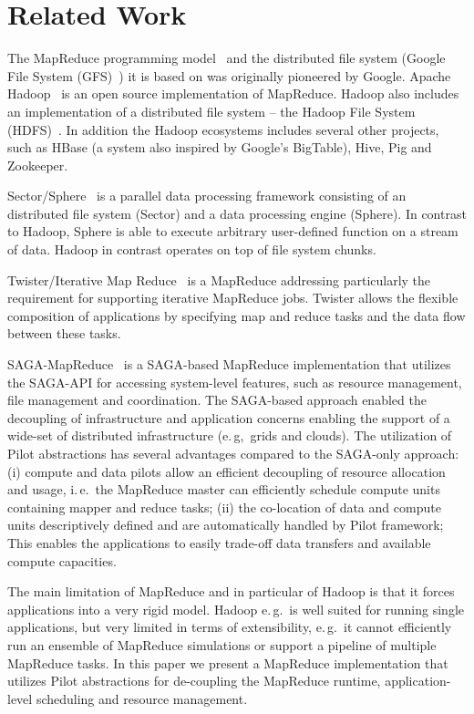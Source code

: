 \documentclass{acm_proc_article-sp}
\newcommand{\pilot}{Pilot\xspace}
\begin{document}
\section{Related Work}

The MapReduce programming model~\cite{Dean:2004:MSD:1251254.1251264} and the
distributed file system (Google File System
(GFS)~\cite{Ghemawat:2003:GFS:1165389.945450}) it is based on was originally
pioneered by Google. Apache Hadoop~\cite{hadoop} is an open source
implementation of MapReduce. Hadoop also includes an implementation of a
distributed file system -- the Hadoop File System
(HDFS)~\cite{Borthakur:2007fk}. In addition the Hadoop ecosystems includes
several other projects, such as HBase (a system also inspired by Google's
BigTable), Hive, Pig and Zookeeper.

Sector/Sphere~\cite{Gu_Grossman_2009} is a parallel data processing framework
consisting of an distributed file system (Sector) and a data processing engine
(Sphere). In contrast to Hadoop, Sphere is able to execute arbitrary 
user-defined function on a stream of data. Hadoop in contrast operates on top 
of file system chunks.

Twister/Iterative Map Reduce~\cite{Ekanayake:2010:TRI:1851476.1851593} is a 
MapReduce addressing particularly the requirement for supporting iterative 
MapReduce jobs. Twister allows the flexible composition of applications by 
specifying map and reduce tasks and the data flow between these tasks. 


SAGA-MapReduce~\cite{Sehgal:2011:UAI:1945091.1945329} is a SAGA-based
MapReduce implementation that utilizes the SAGA-API for accessing system-level
features, such as resource management, file management and coordination. The
SAGA-based approach enabled the decoupling of infrastructure and application
concerns enabling the support of a wide-set of distributed infrastructure
(e.\,g,\ grids and clouds). The utilization of Pilot abstractions has several
advantages compared to the SAGA-only approach: (i) compute and data pilots
allow an efficient decoupling of resource allocation and usage, i.\,e.\ the
MapReduce master can efficiently schedule compute units containing mapper and
reduce tasks; (ii) the co-location of data and compute units descriptively
defined and are automatically handled by Pilot framework; This enables the
applications to easily trade-off data transfers and available compute
capacities.

The main limitation of MapReduce and in particular of Hadoop is that it forces
applications into a very rigid model. Hadoop e.\,g.\ is well suited for
running single applications, but very limited in terms of extensibility,
e.\,g.\ it cannot efficiently run an ensemble of MapReduce simulations or
support a pipeline of multiple MapReduce tasks. In this paper we present a 
MapReduce implementation that utilizes \pilot abstractions for de-coupling the MapReduce runtime, application-level scheduling and resource management.
\end{document}

